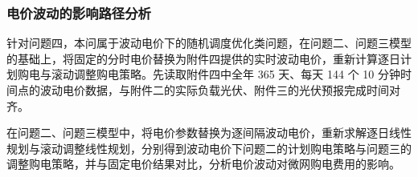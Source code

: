 
\subsubsection{电价波动的影响路径分析}

针对问题四，本问属于波动电价下的随机调度优化类问题，在问题二、问题三模型的基础上，将固定的分时电价替换为附件四提供的实时波动电价，重新计算逐日计划购电与滚动调整购电策略。先读取附件四中全年 365 天、每天 144 个 10 分钟时间点的波动电价数据，与附件二的实际负载光伏、附件三的光伏预报完成时间对齐。

在问题二、问题三模型中，将电价参数替换为逐间隔波动电价，重新求解逐日线性规划与滚动调整线性规划，分别得到波动电价下问题二的计划购电策略与问题三的调整购电策略，并与固定电价结果对比，分析电价波动对微网购电费用的影响。
